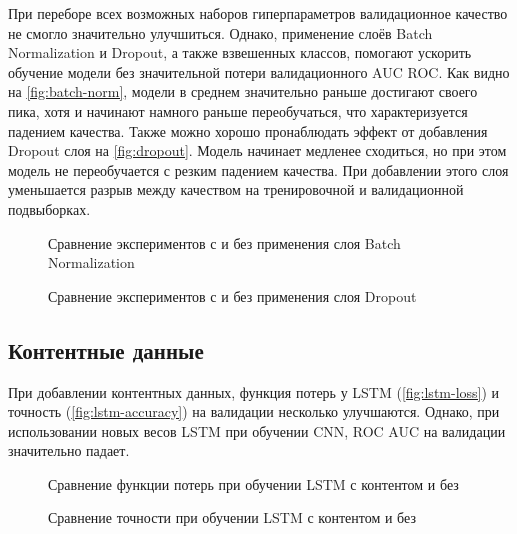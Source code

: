 При переборе всех возможных наборов гиперпараметров валидационное качество не смогло значительно улучшиться. Однако, применение слоёв Batch Normalization и Dropout, а также взвешенных классов, помогают ускорить обучение модели без значительной потери валидационного AUC ROC. Как видно на \autoref{fig:batch-norm}, модели в среднем значительно раньше достигают своего пика, хотя и начинают намного раньше переобучаться, что характеризуется падением качества.
Также можно хорошо пронаблюдать эффект от добавления Dropout слоя на \autoref{fig:dropout}. Модель начинает медленее сходиться, но при этом модель не переобучается с резким падением качества. При добавлении этого слоя уменьшается разрыв между качеством на тренировочной и валидационной подвыборках.

\begin{figure}[h]
\noindent{}
\caption{Сравнение экспериментов с и без применения слоя Batch Normalization}
\label{fig:batch-norm}

\end{figure}
\begin{figure}[h]

\noindent{}
\caption{Сравнение экспериментов с и без применения слоя Dropout}
\label{fig:dropout}

\end{figure}

\subsection{Контентные данные}

При добавлении контентных данных, функция потерь у LSTM (\autoref{fig:lstm-loss}) и точность (\autoref{fig:lstm-accuracy}) на валидации несколько улучшаются. Однако, при использовании новых весов LSTM при обучении CNN, ROC AUC на валидации значительно падает.

\begin{figure}[H]

\noindent{}
\caption{Сравнение функции потерь при обучении LSTM с контентом и без}
\label{fig:lstm-loss}

\end{figure}
\begin{figure}[H]
\noindent{}
\caption{Сравнение точности при обучении LSTM с контентом и без}
\label{fig:lstm-accuracy}

\end{figure}

